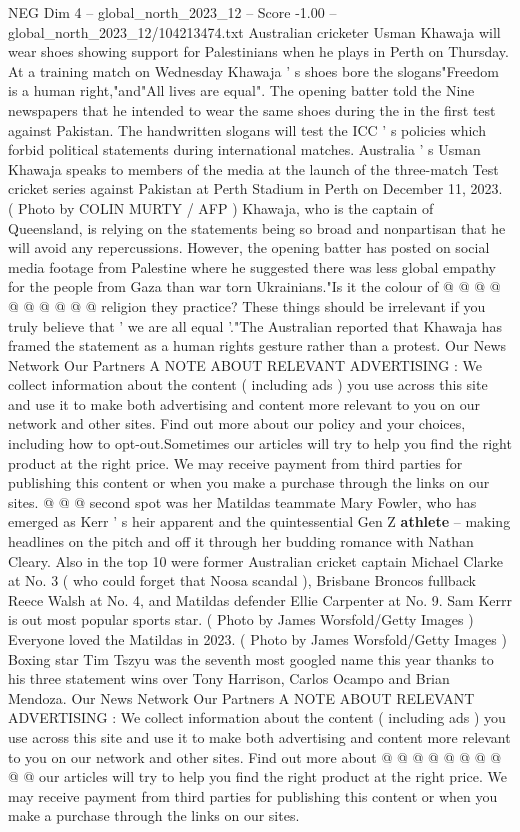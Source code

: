 \begin{textsample}{NEG Dim 4 – global\_north\_2023\_12 – Score -1.00 – global\_north\_2023\_12/104213474.txt}  \label{ex:f4_neg_142}
Australian cricketer Usman Khawaja will wear shoes showing support for Palestinians when he plays in Perth on Thursday.
At a training match on Wednesday Khawaja ' s shoes bore the slogans"Freedom is a human right,"and"All lives are equal".
The opening batter told the Nine newspapers that he intended to wear the same shoes during the in the first test against Pakistan.
The handwritten slogans will test the ICC ' s policies which forbid political statements during international matches.
Australia ' s Usman Khawaja speaks to members of the media at the launch of the three-match Test cricket series against Pakistan at Perth Stadium in Perth on December 11, 2023. ( Photo by COLIN MURTY / AFP ) Khawaja, who is the captain of Queensland, is relying on the statements being so broad and nonpartisan that he will avoid any repercussions.
However, the opening batter has posted on social media footage from Palestine where he suggested there was less global empathy for the people from Gaza than war torn Ukrainians."Is it the colour of @ @ @ @ @ @ @ @ @ @ religion they practice?
These things should be irrelevant if you truly believe that ' we are all equal '."The Australian reported that Khawaja has framed the statement as a human rights gesture rather than a protest.
Our News Network Our Partners A NOTE ABOUT RELEVANT ADVERTISING : We collect information about the content ( including ads ) you use across this site and use it to make both advertising and content more relevant to you on our network and other sites.
Find out more about our policy and your choices, including how to opt-out.Sometimes our articles will try to help you find the right product at the right price.
We may receive payment from third parties for publishing this content or when you make a purchase through the links on our sites. @ @ @ second spot was her Matildas teammate Mary Fowler, who has emerged as Kerr ' s heir apparent and the quintessential Gen Z \textbf{athlete} -- making headlines on the pitch and off it through her budding romance with Nathan Cleary.
Also in the top 10 were former Australian cricket captain Michael Clarke at No. 3 ( who could forget that Noosa scandal ), Brisbane Broncos fullback Reece Walsh at No. 4, and Matildas defender Ellie Carpenter at No. 9.
Sam Kerrr is out most popular sports star. ( Photo by James Worsfold/Getty Images ) Everyone loved the Matildas in 2023. ( Photo by James Worsfold/Getty Images ) Boxing star Tim Tszyu was the seventh most googled name this year thanks to his three statement wins over Tony Harrison, Carlos Ocampo and Brian Mendoza.
Our News Network Our Partners A NOTE ABOUT RELEVANT ADVERTISING : We collect information about the content ( including ads ) you use across this site and use it to make both advertising and content more relevant to you on our network and other sites.
Find out more about @ @ @ @ @ @ @ @ @ @ our articles will try to help you find the right product at the right price.
We may receive payment from third parties for publishing this content or when you make a purchase through the links on our sites.

\end{textsample}
